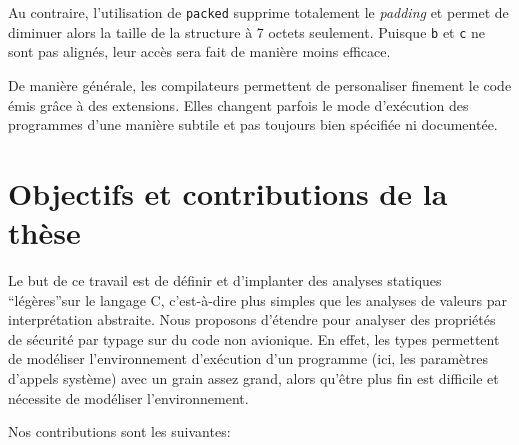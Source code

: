Au contraire, l'utilisation de \texttt{packed} supprime totalement le
\emph{padding} et permet de diminuer alors la taille de la structure à 7 octets
seulement. Puisque \texttt{b} et \texttt{c} ne sont pas alignés, leur accès sera
fait de manière moins efficace.

De manière générale, les compilateurs permettent de personaliser finement le
code émis grâce à des extensions. Elles changent parfois le mode d'exécution des
programmes d'une manière subtile et pas toujours bien spécifiée ni documentée.

\section{Objectifs et contributions de la thèse}


Le but de ce travail est de définir et d'implanter des analyses statiques
\enquote{légères}sur le langage C, c'est-à-dire plus simples que les analyses de
valeurs par interprétation abstraite.  Nous proposons d'étendre \newspeak pour
analyser des propriétés de sécurité par typage sur du code non avionique. En
effet, les types permettent de modéliser l'environnement d'exécution d'un
programme (ici, les paramètres d'appels système) avec un grain assez grand,
alors qu'être plus fin est difficile et nécessite de modéliser l'environnement.

Nos contributions sont les suivantes:


